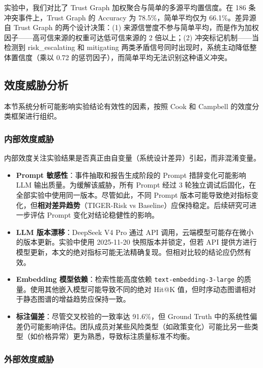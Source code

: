 \documentclass[12pt,a4paper]{article}
\newcommand{\term}[1]{\textbf{#1}}
\begin{document}
实验中，我们对比了 Trust Graph 加权聚合与简单的多源平均置信度。在 186 条冲突事件上，Trust Graph 的 Accuracy 为 78.5\%，简单平均仅为 66.1\%。差异源自 Trust Graph 的两个设计决策：(1) 来源信誉度不参与简单平均，而是作为加权因子——高可信来源的权重可达低可信来源的 2 倍以上；(2) 冲突标记机制——当检测到 risk\_escalating 和 mitigating 两类矛盾信号同时出现时，系统主动降低整体置信度（乘以 0.72 的惩罚因子），而简单平均无法识别这种语义冲突。

\subsection{效度威胁分析}
\label{sec:exp-threats}

本节系统分析可能影响实验结论有效性的因素，按照 Cook 和 Campbell 的效度分类框架进行组织。

\subsubsection{内部效度威胁}

内部效度关注实验结果是否真正由自变量（系统设计差异）引起，而非混淆变量。

\begin{itemize}
    \item \term{Prompt 敏感性}：事件抽取和报告生成阶段的 Prompt 措辞变化可能影响 LLM 输出质量。为缓解该威胁，所有 Prompt 经过 3 轮独立调试后固化，在全部实验中使用同一版本。尽管如此，不同 Prompt 版本可能导致绝对指标变化，但\textbf{相对差异趋势}（TIGER-Risk vs Baseline）应保持稳定。后续研究可进一步评估 Prompt 变化对结论稳健性的影响。
    \item \term{LLM 版本漂移}：DeepSeek V4 Pro 通过 API 调用，云端模型可能存在微小的版本更新。实验中使用 2025-11-20 快照版本并锁定，但若 API 提供方进行模型更新，本文的绝对指标可能无法精确复现。但相对比较的结论应仍然有效。
    \item \term{Embedding 模型依赖}：检索性能高度依赖 \texttt{text-embedding-3-large} 的质量。使用其他嵌入模型可能导致不同的绝对 Hit@K 值，但时序动态图谱相对于静态图谱的增益趋势应保持一致。
    \item \term{标注偏差}：尽管交叉校验的一致率达 91.6\%，但 Ground Truth 中的系统性偏差仍可能影响评估。团队成员对某些风险类型（如政策变化）可能比另一些类型（如价格异常）更为熟悉，导致标注质量标准不均衡。
\end{itemize}

\subsubsection{外部效度威胁}
\end{document}
